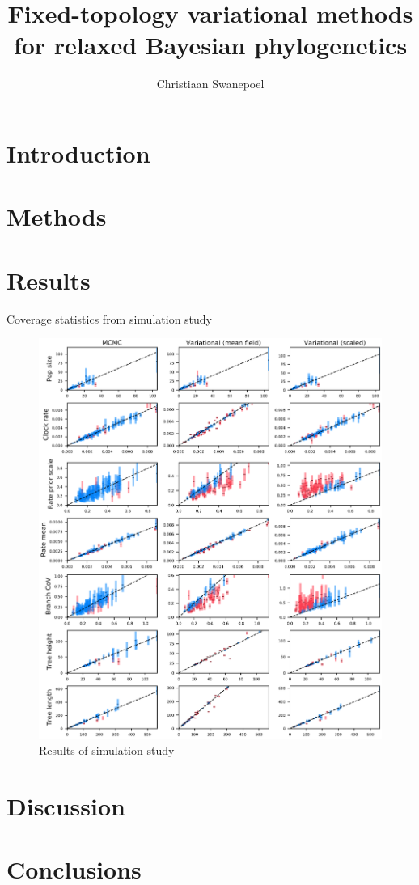 \documentclass{article}
\title{Fixed-topology variational methods for relaxed Bayesian phylogenetics}
\author{Christiaan Swanepoel}
\begin{document}
\maketitle
\section*{Introduction}

\section*{Methods}

\section*{Results}

\begin{table}
    \centering
    
    \caption{Coverage statistics from simulation study}
    \label{tab:coverage}
\end{table}


\begin{figure}
    \centering
    \includegraphics[width=\textwidth]{coverage}
    \caption{Results of simulation study}
    \label{fig:coverage}
\end{figure}

\section*{Discussion}

\section*{Conclusions}
\end{document}
